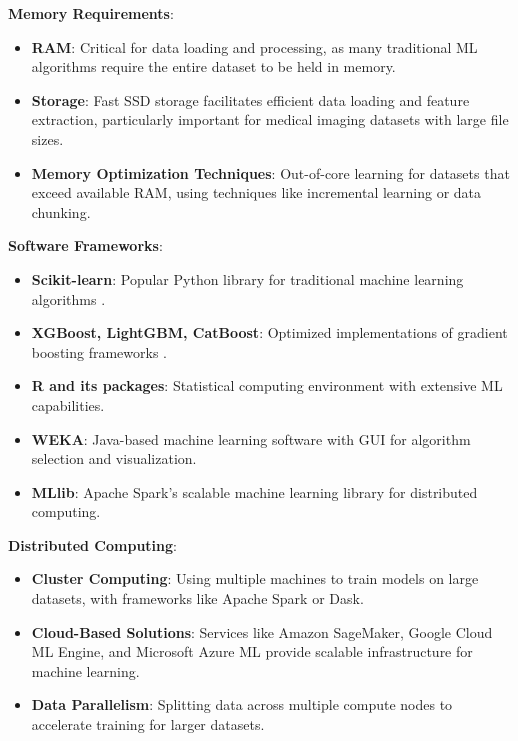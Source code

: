\textbf{Memory Requirements}:
\begin{itemize}
  \item \textbf{RAM}: Critical for data loading and processing, as many traditional ML algorithms require the entire dataset to be held in memory.

  \item \textbf{Storage}: Fast SSD storage facilitates efficient data loading and feature extraction, particularly important for medical imaging datasets with large file sizes.

  \item \textbf{Memory Optimization Techniques}: Out-of-core learning for datasets that exceed available RAM, using techniques like incremental learning or data chunking.
\end{itemize}

\textbf{Software Frameworks}:
\begin{itemize}
  \item \textbf{Scikit-learn}: Popular Python library for traditional machine learning algorithms \cite{pedregosa2011scikit}.

  \item \textbf{XGBoost, LightGBM, CatBoost}: Optimized implementations of gradient boosting frameworks \cite{chen2016xgboost}.

  \item \textbf{R and its packages}: Statistical computing environment with extensive ML capabilities.

  \item \textbf{WEKA}: Java-based machine learning software with GUI for algorithm selection and visualization.

  \item \textbf{MLlib}: Apache Spark's scalable machine learning library for distributed computing.
\end{itemize}

\textbf{Distributed Computing}:
\begin{itemize}
  \item \textbf{Cluster Computing}: Using multiple machines to train models on large datasets, with frameworks like Apache Spark or Dask.

  \item \textbf{Cloud-Based Solutions}: Services like Amazon SageMaker, Google Cloud ML Engine, and Microsoft Azure ML provide scalable infrastructure for machine learning.

  \item \textbf{Data Parallelism}: Splitting data across multiple compute nodes to accelerate training for larger datasets.
\end{itemize}

